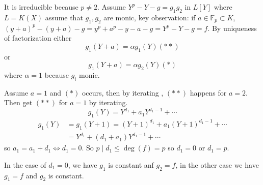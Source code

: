 \documentclass[11pt]{article}
\newcommand{\bbf}{\mathbb F}
\newcommand{\Llrta}{\Longleftrightarrow}
\begin{document}
It is irreducible because $p\neq 2$. Assume $Y^p-Y-g=g_1g_2$ in $L[Y]$ where $L=K(X)$ assume that $g_1,g_2$ are monic, key observation:
if $a\in \bbf_p\subset K$, $(y+a)^p-(y+a)-g=y^p+a^p-y-a-g=Y^p-Y-g=f$. By uniqueness of factorization either 
$$
g_1(Y+a)=\alpha g_1(Y)(**)
$$
or 
$$
g_1(Y+a)=\alpha g_2(Y)(*)
$$
where $\alpha=1$ because $g_i$ monic.


Assume $a=1$ and $(*)$ occurs, then by iterating , $(**)$ happens for $a=2$. Then get $(**)$ for $a=1$ by iterating.
$$
g_1(Y)=Y^{d_1}+a_1Y^{d_1-1}+\cdots
$$
$$
\begin{aligned}
g_1(Y)&=g_1(Y+1)=(Y+1)^{d_1}+a_1 (Y+1)^{d_1-1}+\cdots\\
&=Y^{d_1}+(d_1+a_1)Y^{d_1-1}+\cdots
\end{aligned}
$$
so $a_1=a_1+d_1\Llrta d_1=0$. So $p\mid d_1\leq \deg(f)=p$
so $d_1=0$ or $d_1=p$.

In the case of $d_1=0$, we have $g_1$ is constant anf $g_2=f$, in the other case we have $g_1=f$ and $g_2$ is constant.
\end{document}
